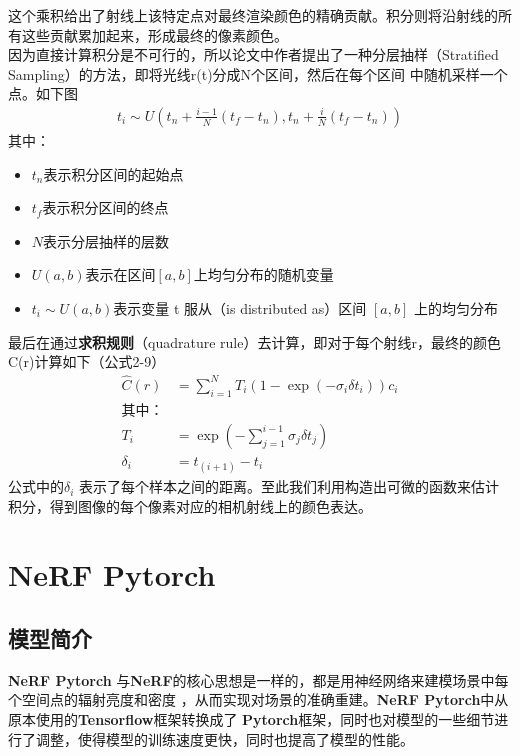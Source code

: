 \documentclass{nwputhesis}
\begin{document}
\indent
这个乘积给出了射线上该特定点对最终渲染颜色的精确贡献。积分则将沿射线的所有这些贡献累加起来，形成最终的像素颜色。\\

\indent
因为直接计算积分是不可行的，所以论文中作者提出了一种分层抽样（Stratified Sampling）的方法，即将光线r(t)分成N个区间，然后在每个区间
中随机采样一个点。如下图
\begin{equation}
    \begin{aligned}
        t_i \sim U\left(t_n + \frac{i-1}{N}(t_f - t_n), t_n + \frac{i}{N}(t_f - t_n)\right)
    \end{aligned}
\end{equation}
\indent
其中：
\begin{itemize}
    \item $t_n$表示积分区间的起始点
    \item $t_f$表示积分区间的终点
    \item $N$表示分层抽样的层数
    \item $U(a,b)$表示在区间$[a,b]$上均匀分布的随机变量
    \item $ t_i \sim U(a,b)$表示变量 t 服从（is distributed as）区间 $[a,b]$ 上的均匀分布
\end{itemize}
\indent
最后在通过\textbf{求积规则}（quadrature rule）去计算，即对于每个射线r，最终的颜色C(r)计算如下（公式2-9）
\begin{equation}
    \begin{aligned}
        \hat{C}(r) &= \sum_{i=1}^{N} T_i(1 - \exp(-\sigma_i\delta t_i))c_i\\
        \text{其中：}\\
        T_i &= \exp(-\sum_{j=1}^{i-1}\sigma_j\delta t_j)\\
        \delta_i &= t_(i+1) - t_i
    \end{aligned}
\end{equation}
\indent
公式中的$\delta_i$ 表示了每个样本之间的距离。至此我们利用构造出可微的函数来估计积分，得到图像的每个像素对应的相机射线上的颜色表达。
\makespace
\hypertarget{section 5}{}
\section{NeRF Pytorch}
\subsection{模型简介}
\textbf{NeRF Pytorch} 与\textbf{NeRF}的核心思想是一样的，都是用神经网络来建模场景中每个空间点的辐射亮度和密度
，从而实现对场景的准确重建。\textbf{NeRF Pytorch}中从原本使用的\textbf{Tensorflow}框架转换成了\textbf{
Pytorch}框架，同时也对模型的一些细节进行了调整，使得模型的训练速度更快，同时也提高了模型的性能。
\end{document}

